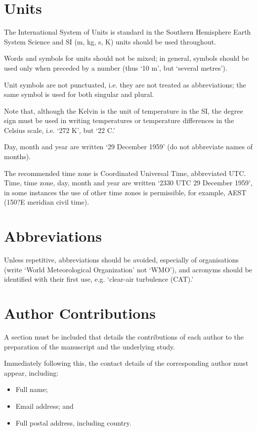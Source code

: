 \documentclass[10pt]{article}
\begin{document}
\section{Units}
\label{Unites}
The International System of Units is standard in the Southern Hemisphere Earth System Science and SI (m, kg, s, K) units should be used throughout. 

Words and symbols for units should not be mixed; in general, symbols should be used only when preceded by a number (thus `10 m', but `several metres').

Unit symbols are not punctuated, i.e. they are not treated as abbreviations; the same symbol is used for both singular and plural.

Note that, although the Kelvin is the unit of temperature in the SI, the degree sign must be used in writing temperatures or temperature differences in the Celsius scale, i.e. `272 K', but `22 \textdegree C.' 

Day, month and year are written `29 December 1959' (do not abbreviate names of months). 

The recommended time zone is Coordinated Universal Time, abbreviated UTC. Time, time zone, day, month and year are written `2330 UTC 29 December 1959', in some instances the use of other time zones is permissible, for example, AEST (150?E meridian civil time).

\section{Abbreviations}
Unless repetitive, abbreviations should be avoided, especially of organisations (write `World Meteorological Organization' not `WMO'), and acronyms should be identified with their first use, e.g. `clear-air turbulence (CAT).'

\section{Author Contributions}
A section must be included that details the contributions of each author to the preparation of the manuscript and the underlying study.

Immediately following this, the contact details of the corresponding author must appear, including:
\begin{itemize}
  \item Full name;
  \item Email address; and
  \item Full postal address, including country.
\end{itemize}
\end{document}
